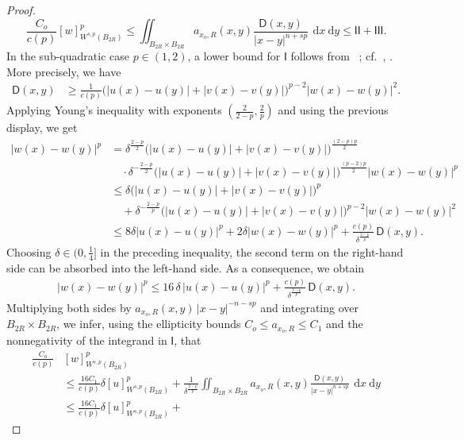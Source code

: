 \documentclass[10pt,letterpaper]{amsart}
\theoremstyle{definition}
\numberwithin{theorem}{section}
\numberwithin{equation}{section}
\newcommand{\1}{\ensuremath{\mathds{1}}}
\newcommand\sfI{{\boldsymbol{\mathsf I}}}
\newcommand\sfD{{\boldsymbol{\mathsf D}}}
\renewcommand{\d}{\:\! \mathrm{d}}
\numberwithin{equation}{section}
\begin{document}
\begin{proof}
\begin{equation*}
    \frac{C_o}{c(p)} [w]_{W^{s,p}(B_{2R})}^p
    \le \iint_{B_{2R}\times B_{2R} }
    a_{x_o,R}(x,y)\frac{\sfD (x,y)}{|x-y|^{n+sp}} \, \d x \d y
 \le\sfI\sfI+\sfI
    \sfI\sfI.
\end{equation*}
In the sub-quadratic case $p \in (1,2)$, a lower bound for $\sfI$ follows from ~\cite[Lemma~2.2]{BDLMS-1}; cf.~\cite[Lemma~2.1]{Acerbi-Fusco}, \cite[Lemma~2.2]{GiaquintaModica:1986}. 
More precisely, we have
\begin{align*}
    \sfD(x,y) 
    &\ge 
    \frac{1}{c(p)} \big(|u(x)-u(y)| + |v(x)-v(y)|\big)^{p-2} |w(x)-w(y)|^2.
\end{align*}
Applying Young's inequality with exponents $(\frac{2}{2-p},\frac{2}{p})$ and using the previous display, we get
\begin{align*}
    |w(x)-w(y)|^p
    &= 
    \delta^{\frac{2-p}{2}} \big(|u(x)-u(y)|+|v(x)-v(y)|\big)^{\frac{(2-p)p}{2}} \\
    &\quad \cdot 
    \delta^{-\frac{2-p}{2}} \big(|u(x)-u(y)|+|v(x)-v(y)|\big)^{\frac{(p-2)p}{2}} |w(x)-w(y)|^p \\
    &\le 
    \delta \big(|u(x)-u(y)|+|v(x)-v(y)|\big)^p \\
    &\quad + 
    \delta^{-\frac{2-p}{p}} \big(|u(x)-u(y)|+|v(x)-v(y)|\big)^{p-2} |w(x)-w(y)|^2 \\
    &\le 
    8 \delta |u(x)-u(y)|^p + 2 \delta |w(x)-w(y)|^p 
    + \frac{c(p)}{\delta^{\frac{2-p}{p}}} \, \sfD(x,y).
\end{align*}
Choosing $\delta\in\bigl(0,\tfrac14\bigr]$ in the preceding inequality,
the second term on the right-hand side can be absorbed into the left-hand side.
As a consequence, we obtain
\begin{align*}
    |w(x)-w(y)|^p
    \le 
    16\,\delta\,|u(x)-u(y)|^p
    + \frac{c(p)}{\delta^{\frac{2-p}{p}}}\,\sfD (x,y).
\end{align*}
Multiplying both sides by $a_{x_o,R}(x,y)\,|x-y|^{-n-sp}$ and integrating over
$B_{2R}\times B_{2R}$, we infer, using the ellipticity bounds
$C_o\le a_{x_o,R}\le C_1$ and the nonnegativity of the integrand in $\sfI$, that
\begin{align*}
    \frac{C_o}{c(p)}&[w]_{W^{s,p}(B_{2R})}^p \\
    &\leq 
    \frac{16C_1}{c(p)}\delta [u]_{W^{s,p}(B_{2R})}^p +
    \frac{1}{\delta^{\frac{2-p}{p}}} \iint_{B_{2R}\times B_{2R} }
    a_{x_o,R}(x,y)\frac{\sfD (x,y)}{|x-y|^{n+sp}} \, \d x \d y \\
    &\leq \frac{16C_1}{c(p)}\delta [u]_{W^{s,p}(B_{2R})}^p +

\end{align*}
\end{proof}
\end{document}
